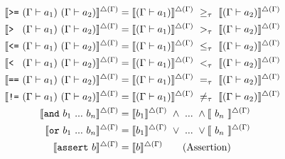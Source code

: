 
\begin{align}
    \llbracket \text{\texttt{>=}}~(\Gamma\vdash{a_1})~(\Gamma\vdash{a_2}) \rrbracket^{\triangle(\Gamma)} &= \llbracket (\Gamma\vdash{a_1}) \rrbracket^{\triangle(\Gamma)}~\geq_\tau~\llbracket (\Gamma\vdash{a_2}) \rrbracket^{\triangle(\Gamma)}\\
    \llbracket \text{\texttt{> }}~(\Gamma\vdash{a_1})~(\Gamma\vdash{a_2}) \rrbracket^{\triangle(\Gamma)} &= \llbracket (\Gamma\vdash{a_1}) \rrbracket^{\triangle(\Gamma)}~>_\tau~\llbracket (\Gamma\vdash{a_2}) \rrbracket^{\triangle(\Gamma)}\\
    \llbracket \text{\texttt{<=}}~(\Gamma\vdash{a_1})~(\Gamma\vdash{a_2}) \rrbracket^{\triangle(\Gamma)} &= \llbracket (\Gamma\vdash{a_1}) \rrbracket^{\triangle(\Gamma)}~\leq_\tau~\llbracket (\Gamma\vdash{a_2}) \rrbracket^{\triangle(\Gamma)}\\
    \llbracket \text{\texttt{< }}~(\Gamma\vdash{a_1})~(\Gamma\vdash{a_2}) \rrbracket^{\triangle(\Gamma)} &= \llbracket (\Gamma\vdash{a_1}) \rrbracket^{\triangle(\Gamma)}~<_\tau~\llbracket (\Gamma\vdash{a_2}) \rrbracket^{\triangle(\Gamma)}\\
    \llbracket \text{\texttt{==}}~(\Gamma\vdash{a_1})~(\Gamma\vdash{a_2}) \rrbracket^{\triangle(\Gamma)} &= \llbracket (\Gamma\vdash{a_1}) \rrbracket^{\triangle(\Gamma)}~=_\tau~\llbracket (\Gamma\vdash{a_2}) \rrbracket^{\triangle(\Gamma)}\\
    \llbracket \text{\texttt{!=}}~(\Gamma\vdash{a_1})~(\Gamma\vdash{a_2}) \rrbracket^{\triangle(\Gamma)} &= \llbracket (\Gamma\vdash{a_1}) \rrbracket^{\triangle(\Gamma)}~\neq_\tau~\llbracket (\Gamma\vdash{a_2}) \rrbracket^{\triangle(\Gamma)} \\
    \llbracket \text{\texttt{and}}~b_1~...~b_n\rrbracket^{\triangle(\Gamma)} &= \llbracket b_1 \rrbracket^{\triangle(\Gamma)}~\land~...~\land\llbracket~b_n~\rrbracket^{\triangle(\Gamma)}\\
    \llbracket \text{\texttt{or}}~b_1~...~b_n\rrbracket^{\triangle(\Gamma)} &= \llbracket b_1 \rrbracket^{\triangle(\Gamma)}~\lor~...~\lor\llbracket~b_n~\rrbracket^{\triangle(\Gamma)}\\
    \llbracket \text{\texttt{assert}}~b\rrbracket^{\triangle(\Gamma)} &= \llbracket b \rrbracket^{\triangle(\Gamma)} \tag{Assertion}
\end{align}

